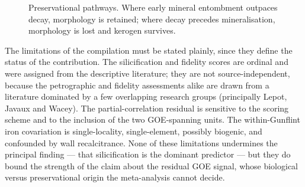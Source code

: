 \documentclass[11pt]{article}
\begin{document}
\begin{figure}[t]
\centering
{}
\caption{Preservational pathways. Where early mineral entombment outpaces decay, morphology is
retained; where decay precedes mineralisation, morphology is lost and kerogen survives.}
\label{fig:model}
\end{figure}

The limitations of the compilation must be stated plainly, since they define the status of the
contribution. The silicification and fidelity scores are ordinal and were assigned from the
descriptive literature; they are not source-independent, because the petrographic and fidelity
assessments alike are drawn from a literature dominated by a few overlapping research groups
(principally Lepot, Javaux and Wacey). The partial-correlation residual is sensitive to the scoring
scheme and to the inclusion of the two GOE-spanning units. The within-Gunflint iron covariation is
single-locality, single-element, possibly biogenic, and confounded by wall recalcitrance. None of
these limitations undermines the principal finding --- that silicification is the dominant predictor
--- but they do bound the strength of the claim about the residual GOE signal, whose biological
versus preservational origin the meta-analysis cannot decide.
\end{document}
